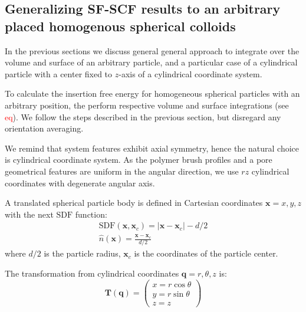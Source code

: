 \documentclass[10pt, a4paper]{article}
\newcommand\todo[1]{\textcolor{red}{#1}}
\begin{document}
\subsection*{Generalizing SF-SCF results to an arbitrary placed homogenous spherical colloids}
\begin{multicols}{2}

In the previous sections we discuss general general approach to integrate over the volume and surface of an arbitrary particle, and a particular case of a cylindrical particle with a center fixed to $z$-axis of a cylindrical coordinate system.

To calculate the insertion free energy for homogeneous spherical particles with an arbitrary position, the perform respective volume and surface integrations (see \todo{eq}).
We follow the steps described in the previous section, but disregard any orientation averaging.

We remind that system features exhibit axial symmetry, hence the natural choice is cylindrical coordinate system.
As the polymer brush profiles and a pore geometrical features are uniform in the angular direction, we use $rz$ cylindrical coordinates with degenerate angular axis.

A translated spherical particle body is defined in Cartesian coordinates $\bm{x} = x,y,z$ with the next $\textrm{SDF}$ function:
\begin{gather}
    \textrm{SDF}(\bm{x}, \bm{x}_{c}) = \left| \bm{x} - \bm{x}_{c} \right| - d/2
    \\
    \hat{n}(\bm{x}) =  \frac{\bm{x} - \bm{x}_{c}}{d/2}
\end{gather}
where $d/2$ is the particle radius, $\bm{x}_{c}$ is the coordinates of the particle center.

The transformation from cylindrical coordinates $\bm{q} = r,  \theta, z$ is:
\begin{equation}
    \bm{T}(\bm{q}) = 
    \begin{pmatrix}
        x = r \cos \theta\\
        y = r \sin \theta\\
        z = z
    \end{pmatrix}
\end{equation}


\end{multicols}
\end{document}
